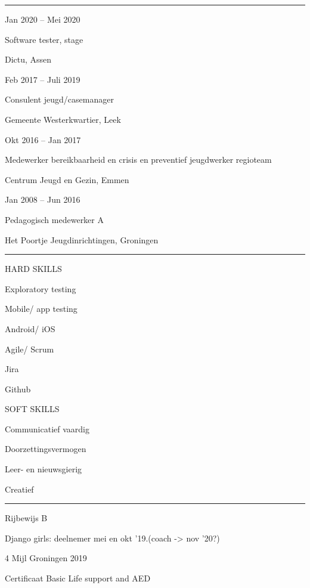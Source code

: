 \documentclass[a4paper,12pt,twoside]{article}
\newlength{\cvcolumngapwidth}
\newlength{\cvleftcolumnwidth}
\newlength{\cvrightcolumnwidth}
\newcommand{\cvsectionstyle}[1]{{\normalsize\cvsectionfont\textcolor{cvsectioncolor}{#1}}}
\newcommand{\cvtitlestyle}[1]{{\large\cvtitlefont\textcolor{cvtitlecolor}{#1}}}
\newcommand{\cvdurationstyle}[1]{{\small\cvdurationfont\textcolor{cvdurationcolor}{#1}}}
\newcommand{\cvheadingstyle}[1]{{\normalsize\cvheadingfont\textcolor{cvheadingcolor}{#1}}}
\newlength{\cvafteritemskipamount}
\newlength{\cvaftersectionskipamount}
\newlength{\cvaftertitleskipamount}
\newlength{\cvparskip}
\newcommand{\cvsection}[1]{
    \begin{minipage}[t]{\cvleftcolumnwidth}
        \raggedleft\cvsectionstyle{#1}
    \end{minipage}%
    \hspace{\cvcolumngapwidth}%
    \begin{minipage}[t]{\cvrightcolumnwidth}
        \textcolor{cvrulecolor}{\rule{\cvrightcolumnwidth}{0.3mm}}
    \end{minipage}

    \vspace{\cvaftersectionskipamount}
}
\newcommand{\cvitem}[2]{
    \begin{minipage}[t]{\cvleftcolumnwidth}
        \raggedleft #1
    \end{minipage}%
    \hspace{\cvcolumngapwidth}%
    \begin{minipage}[t]{\cvrightcolumnwidth}
        \setlength{\parskip}{\cvparskip} #2
    \end{minipage}

    \vspace{\cvafteritemskipamount}
}
\newcommand{\cvtitle}[1]{
    \cvtitlestyle{#1}

    \vspace{\cvaftertitleskipamount}
    \vspace{-\cvparskip}
}
\begin{document}

\cvsection{WERKERVARING}

\cvitem{
    \cvdurationstyle{Jan 2020 -- Mei 2020}
}{
    \cvtitle{Software tester, stage}

    Dictu, Assen

    
}

\cvitem{
    \cvdurationstyle{Feb 2017 -- Juli 2019}
}{
    \cvtitle{Consulent jeugd/casemanager}

    Gemeente Westerkwartier, Leek

}

\cvitem{
    \cvdurationstyle{Okt 2016 -- Jan 2017}
}{
    \cvtitle{Medewerker bereikbaarheid en crisis en preventief jeugdwerker regioteam}

    Centrum Jeugd en Gezin, Emmen
    
    
}

\cvitem{
    \cvdurationstyle{Jan 2008 -- Jun 2016}
}{
    \cvtitle{Pedagogisch medewerker A}

    Het Poortje Jeugdinrichtingen, Groningen

    
}


\cvsection{VAARDIGHEDEN}
\cvitem{
    \cvheadingstyle{}
}{
    \cvtitle{HARD SKILLS}
    
    
        Exploratory testing
        
        Mobile/ app testing
        
        Android/ iOS
        
        Agile/ Scrum
        
        Jira
        
        Github
      
}
        
\cvitem{
    \cvheadingstyle{}
}{
    \cvtitle{SOFT SKILLS}
        Communicatief vaardig
        
        Doorzettingsvermogen
        
        Leer- en nieuwsgierig
        
        Creatief

}

\cvsection{OVERIG}
\cvitem{
    \cvheadingstyle{}
}{  
    Rijbewijs B
    
    Django girls: deelnemer mei en okt '19.(coach -> nov '20?)
    
    4 Mijl Groningen 2019
    
    Certificaat Basic Life support and AED
}
\end{document}
